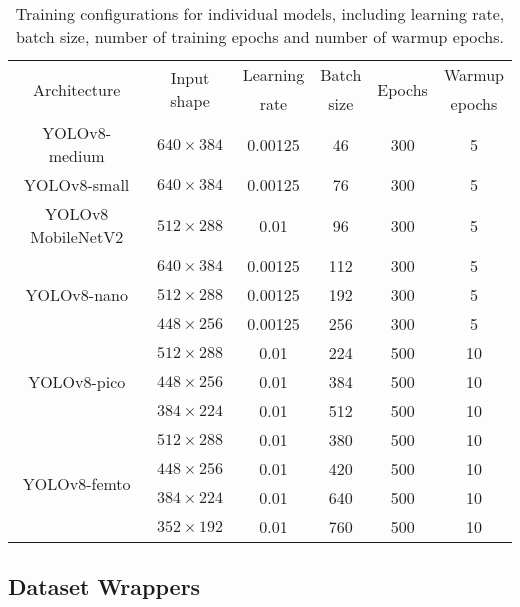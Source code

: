 \begin{table}[h]
\centering
\small
\begin{tabular}{|c|c|c|c|c|c|}
    \hline
    \multirow{2}{*}{Architecture}& \multirow{2}{*}{Input shape} & Learning & Batch & \multirow{2}{*}{Epochs} & Warmup \\
                                 &                              & rate     & size  &                         & epochs \\
    \hline
    \hline
    YOLOv8-medium                & $640 \times 384$ & 0.00125 & 46  & 300 & 5 \\
    \hline
    YOLOv8-small                 & $640 \times 384$ & 0.00125 & 76  & 300 & 5 \\
    \hline
    YOLOv8 MobileNetV2           & $512 \times 288$ & 0.01    & 96  & 300 & 5 \\
    \hline
    \multirow{3}{*}{YOLOv8-nano} & $640 \times 384$ & 0.00125 & 112 & 300 & 5 \\
                                 & $512 \times 288$ & 0.00125 & 192 & 300 & 5 \\
                                 & $448 \times 256$ & 0.00125 & 256 & 300 & 5 \\
    \hline
    \multirow{3}{*}{YOLOv8-pico} & $512 \times 288$ & 0.01    & 224 & 500 & 10 \\
                                 & $448 \times 256$ & 0.01    & 384 & 500 & 10 \\
                                 & $384 \times 224$ & 0.01    & 512 & 500 & 10 \\
    \hline
    \multirow{4}{*}{YOLOv8-femto}& $512 \times 288$ & 0.01    & 380 & 500 & 10 \\
                                 & $448 \times 256$ & 0.01    & 420 & 500 & 10 \\
                                 & $384 \times 224$ & 0.01    & 640 & 500 & 10 \\
                                 & $352 \times 192$ & 0.01    & 760 & 500 & 10 \\
    \hline
\end{tabular}
\caption{Training configurations for individual models, including learning rate, batch size, number of training epochs and number of warmup epochs.}
\label{ModelSpecificConfigurations}
\end{table}


\subsection{Dataset Wrappers}

